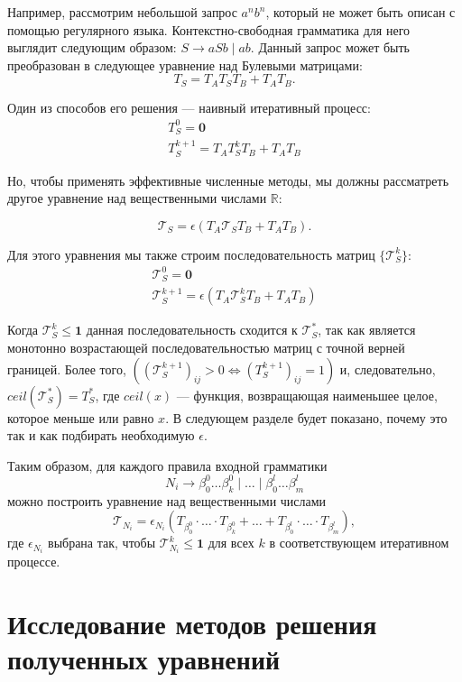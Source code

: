 \documentclass[12pt]{matmex-diploma-custom}
\begin{document}
Например, рассмотрим небольшой запрос $a^nb^n$, который не может быть описан с помощью регулярного языка. Контекстно-свободная грамматика для него выглядит следующим образом: $S \rightarrow aSb \mid ab$. 
Данный запрос может быть преобразован в следующее уравнение над Булевыми матрицами:
$$T_S = T_AT_ST_B + T_AT_B.$$

Один из способов его решения --- наивный итеративный процесс:
\begin{gather*} 
T_S^0 = \mathbf{0} \\
T_S^{k+1} = T_A T_S^k T_B + T_A T_B
\end{gather*} 

Но, чтобы применять эффективные численные методы, мы должны рассматреть другое уравнение над вещественными числами $\mathbb{R}$:

$$\mathcal{T}_S = \epsilon(T_A \mathcal{T}_S T_B + T_A T_B).$$

Для этого уравнения мы также строим последовательность матриц $\{ \mathcal{T}_S^{k}\}$: 
\begin{gather*} 
\mathcal{T}_S^0 = \mathbf{0} \\
\mathcal{T}_S^{k+1} = \epsilon(T_A \mathcal{T}_S^k T_B + T_A T_B)
\end{gather*} 

Когда  $\mathcal{T}_S^{k} \leq \textbf{1}$ данная последовательность сходится к $\mathcal{T}_S^*$, так как является монотонно возрастающей последовательностью матриц с точной верней границей.
Более того, $((\mathcal{T}_S^{k+1})_{ij} > 0 \Leftrightarrow (T_S^{k+1})_{ij} = 1)$ и, следовательно, $ceil(\mathcal{T}_S^*) = T_S^*$, где $ceil(x)$ --- функция, возвращающая наименьшее целое, которое меньше или равно $x$. 
В следующем разделе будет показано, почему это так и как подбирать необходимую $\epsilon$.

Таким образом, для каждого правила входной грамматики
$$N_i \to \beta^0_0 \dots \beta^0_k \mid \ldots \mid \beta^l_0 \dots \beta^l_m$$
можно построить уравнение над вещественными числами
$$\mathcal{T}_{N_i} = \epsilon_{N_i}(T_{\beta^0_0}\cdot \ldots \cdot T_{\beta^0_k} + \ldots + T_{\beta^l_0}\cdot \ldots \cdot T_{\beta^l_m}), $$
где $\epsilon_{N_i}$ выбрана так, чтобы $\mathcal{T}_{N_i}^{k} \leq \textbf{1}$ для всех $k$ в соответствующем итеративном процессе.



\section{Исследование методов решения полученных уравнений}
\end{document}
